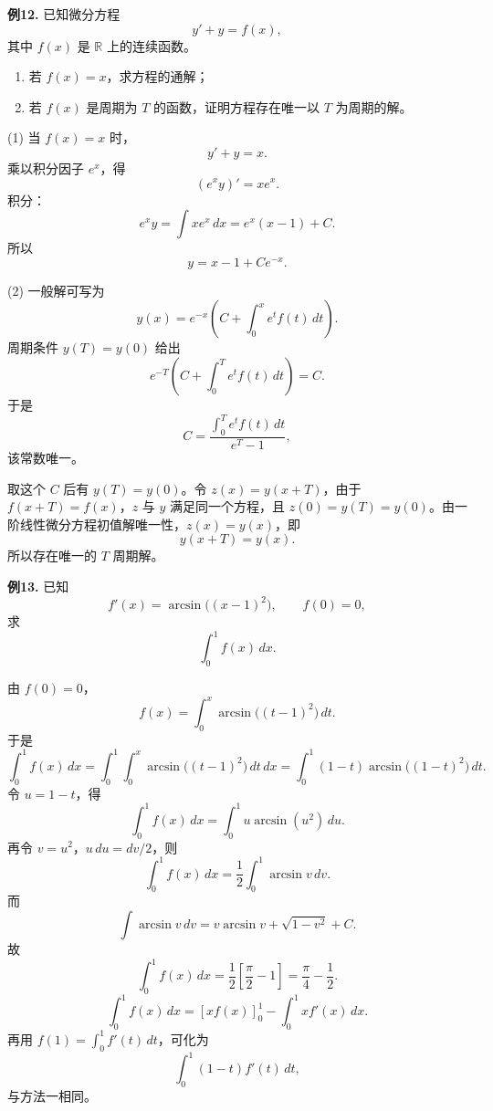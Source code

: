 \begin{problemblock}
\textbf{例12.} 已知微分方程
\[
y'+y=f(x),
\]
其中 \(f(x)\) 是 \(\mathbb{R}\) 上的连续函数。
\begin{enumerate}[label=(\arabic*), leftmargin=2.2em]
\item 若 \(f(x)=x\)，求方程的通解；
\item 若 \(f(x)\) 是周期为 \(T\) 的函数，证明方程存在唯一以 \(T\) 为周期的解。
\end{enumerate}
\end{problemblock}
\begin{solutionblock}
(1) 当 \(f(x)=x\) 时，
\[
y'+y=x.
\]
乘以积分因子 \(e^x\)，得
\[
(e^xy)'=xe^x.
\]
积分：
\[
e^xy=\int xe^x\,dx=e^x(x-1)+C.
\]
所以
\[
y=x-1+Ce^{-x}.
\]

(2) 一般解可写为
\[
y(x)=e^{-x}\left(C+\int_0^x e^t f(t)\,dt\right).
\]
周期条件 \(y(T)=y(0)\) 给出
\[
e^{-T}\left(C+\int_0^T e^t f(t)\,dt\right)=C.
\]
于是
\[
C=\frac{\displaystyle\int_0^T e^t f(t)\,dt}{e^T-1},
\]
该常数唯一。

取这个 \(C\) 后有 \(y(T)=y(0)\)。令 \(z(x)=y(x+T)\)，由于 \(f(x+T)=f(x)\)，\(z\) 与 \(y\) 满足同一个方程，且 \(z(0)=y(T)=y(0)\)。由一阶线性微分方程初值解唯一性，\(z(x)=y(x)\)，即
\[
y(x+T)=y(x).
\]
所以存在唯一的 \(T\) 周期解。
\end{solutionblock}

\begin{problemblock}
\textbf{例13.} 已知
\[
f'(x)=\arcsin\bigl((x-1)^2\bigr),\qquad f(0)=0,
\]
求
\[
\int_0^1 f(x)\,dx.
\]
\end{problemblock}
\begin{solutionblock}
由 \(f(0)=0\)，
\[
f(x)=\int_0^x \arcsin\bigl((t-1)^2\bigr)\,dt.
\]
于是
\[
\int_0^1f(x)\,dx
=\int_0^1\int_0^x \arcsin\bigl((t-1)^2\bigr)\,dt\,dx
=\int_0^1(1-t)\arcsin\bigl((1-t)^2\bigr)\,dt.
\]
令 \(u=1-t\)，得
\[
\int_0^1f(x)\,dx=\int_0^1u\arcsin(u^2)\,du.
\]
再令 \(v=u^2\)，\(u\,du=dv/2\)，则
\[
\int_0^1f(x)\,dx
=\frac12\int_0^1\arcsin v\,dv.
\]
而
\[
\int\arcsin v\,dv
=v\arcsin v+\sqrt{1-v^2}+C.
\]
故
\[
\int_0^1f(x)\,dx
=\frac12\left[\frac\pi2-1\right]
=\frac\pi4-\frac12.
\]
\[
\int_0^1 f(x)\,dx=[xf(x)]_0^1-\int_0^1x f'(x)\,dx.
\]
再用 \(f(1)=\int_0^1 f'(t)\,dt\)，可化为
\[
\int_0^1(1-t)f'(t)\,dt,
\]
与方法一相同。
\end{solutionblock}

